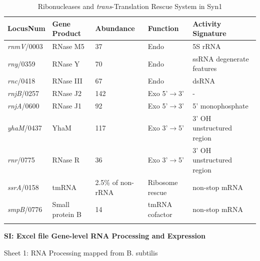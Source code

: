\begin{table}[H]
\centering
\caption{Ribonucleases and \textit{trans}-Translation Rescue System in Syn1}
\begin{tabular}{C{2cm} C{3cm} C{2.0cm} C{3.0cm} C{4.0cm}}
\toprule
LocusNum & Gene Product & Abundance & Function & Activity Signature\\
\midrule

\textit{rnmV}/0003 & RNase M5 & 37 & Endo  & 5S rRNA\\
\textit{rny}/0359  & RNase Y & 70 & Endo &  ssRNA \newline degenerate features \\
\textit{rnc}/0418  & RNase III & 67 & Endo  & dsRNA \\

\hline

\textit{rnjB}/0257 & RNase J2 & 142 & Exo 5'$\rightarrow$3' & - \\
\textit{rnjA}/0600 & RNase J1 & 92 & Exo 5'$\rightarrow$3'  & 5' monophosphate \\
\textit{yhaM}/0437 & YhaM & 117 & Exo 3'$\rightarrow$5' & 3' OH \newline unstructured region \\
\textit{rnr}/0775  & RNase R & 36 & Exo 3'$\rightarrow$5' & 3' OH \newline unstructured region\\

\hline

\textit{ssrA}/0158 & tmRNA & 2.5\% of non-rRNA & Ribosome rescue & non-stop mRNA \\
\textit{smpB}/0776 & Small protein B & 14 & tmRNA cofactor & non-stop mRNA \\


\bottomrule
\label{tbl:rnase_syn1_syn3a}
\end{tabular}

\end{table}

\textbf{SI: Excel file Gene-level RNA Processing and Expression}

Sheet 1: RNA Processing mapped from B. subtilis